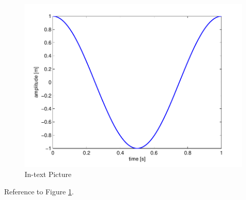 \lipsum[9] %

\begin{figure}[ht]\centering
\includegraphics[width=\linewidth]{results}
\caption{In-text Picture}
\label{fig:results}
\end{figure}

Reference to Figure \ref{fig:results}.


